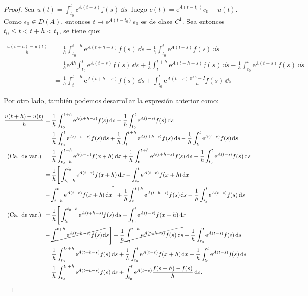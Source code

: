 \begin{proof}
    Sea $\displaystyle u(t) = \int_{t_0}^t \mathrm{e}^{A(t-s)}f(s) \, \dd s$, luego $e(t) = \mathrm{e}^{A(t-t_0)}e_0 + u(t)$. Como $e_0 \in D(A)$, entonces $t \mapsto \mathrm{e}^{A(t-t_0)}e_0$ es de clase $C^1$. Sea entonces $t_0 \leq t < t + h < t_1$, se tiene que:

    \begin{align*}
        \frac{u(t+h) - u(t)}{h} &= \frac{1}{h}\int_{t_0}^{t+h} \mathrm{e}^{A(t + h -s)}f(s) \, \dd s - \frac{1}{h}\int_{t_0}^t \mathrm{e}^{A(t-s)}f(s) \, \dd s\\
        &= \frac{1}{h}\mathrm{e}^{Ah}\int_{t_0}^{t} \mathrm{e}^{A(t-s)}f(s) \, \dd s + \frac{1}{h}\int_{t}^{t+h} \mathrm{e}^{A(t + h -s)}f(s) \, \dd s - \frac{1}{h}\int_{t_0}^t \mathrm{e}^{A(t-s)}f(s) \, \dd s\\
        &= \frac{1}{h}\int_{t}^{t+h} \mathrm{e}^{A(t + h -s)}f(s) \, \dd s + \int_{t_0}^t \mathrm{e}^{A(t-s)}\frac{\mathrm{e}^{Ah} - I}{h}f(s) \, \dd s
    \end{align*}

    Por otro lado, también podemos desarrollar la expresión anterior como:

    \begin{align*}
        \frac{u(t+h) - u(t)}{h} &= \frac{1}{h}\int_{t_0}^{t+h} \mathrm{e}^{A(t + h -s)}f(s) \, \mathrm{d} s - \frac{1}{h}\int_{t_0}^t \mathrm{e}^{A(t-s)}f(s) \, \mathrm{d} s\\
        &= \frac{1}{h}\int_{t_0}^{t} \mathrm{e}^{A(t + h -s)}f(s) \, \mathrm{d} s + \frac{1}{h}\int_{t}^{t+h} \mathrm{e}^{A(t + h -s)}f(s) \, \mathrm{d} s - \frac{1}{h}\int_{t_0}^t \mathrm{e}^{A(t-s)}f(s) \, \mathrm{d} s\\
        \text{(Ca. de var.) }&= \frac{1}{h}\int_{t_0 - h}^{t-h} \mathrm{e}^{A(t-x)}f(x + h) \, \mathrm{d} x + \frac{1}{h}\int_{t}^{t+h} \mathrm{e}^{A(t + h -s)}f(s) \, \mathrm{d} s - \frac{1}{h}\int_{t_0}^t \mathrm{e}^{A(t-s)}f(s) \, \mathrm{d} s\\
        &= \frac{1}{h}\Bigg[ \int_{t_0 - h}^{t_0} \mathrm{e}^{A(t-x)}f(x + h) \, \mathrm{d} x + \int_{t_0}^{t} \mathrm{e}^{A(t-x)}f(x + h) \, \mathrm{d} x\\
        &- \int_{t - h}^{t} \mathrm{e}^{A(t-x)}f(x + h) \, \mathrm{d} x\Bigg ] + \frac{1}{h}\int_{t}^{t+h} \mathrm{e}^{A(t + h -s)}f(s) \, \mathrm{d} s - \frac{1}{h}\int_{t_0}^t \mathrm{e}^{A(t-s)}f(s) \, \mathrm{d} s\\
        \text{(Ca. de var.) }&=\frac{1}{h}\Bigg[ \int_{t_0}^{t_0 + h} \mathrm{e}^{A(t+h-s)}f(s) \, \mathrm{d} s + \int_{t_0}^{t} \mathrm{e}^{A(t-x)}f(x + h) \, \mathrm{d} x\\
        &- \cancel{\int_{t}^{t+h} \mathrm{e}^{A(t+h-s)}f(s) \, \mathrm{d} s}\Bigg ] + \cancel{\frac{1}{h}\int_{t}^{t+h} \mathrm{e}^{A(t + h -s)}f(s) \, \mathrm{d} s} - \frac{1}{h}\int_{t_0}^t \mathrm{e}^{A(t-s)}f(s) \, \mathrm{d} s\\
        &= \frac{1}{h} \int_{t_0}^{t_0 + h} \mathrm{e}^{A(t+h-s)}f(s) \, \mathrm{d} s + \frac{1}{h}\int_{t_0}^{t} \mathrm{e}^{A(t-x)}f(x + h) \, \mathrm{d} x - \frac{1}{h}\int_{t_0}^t \mathrm{e}^{A(t-s)}f(s) \, \mathrm{d} s\\
        &= \frac{1}{h} \int_{t_0}^{t_0 + h} \mathrm{e}^{A(t+h-s)}f(s) \, \mathrm{d} s + \int_{t_0}^t \mathrm{e}^{A(t-s)}\frac{f(s+h) - f(s)}{h} \, \mathrm{d} s.
    \end{align*}


\end{proof}
